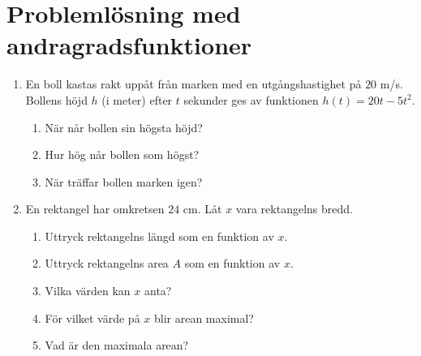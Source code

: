 \documentclass[a4paper,11pt]{article}
\begin{document}
\section{Problemlösning med andragradsfunktioner}

\begin{enumerate}[label=\textbf{\arabic*.}]
    \item En boll kastas rakt uppåt från marken med en utgångshastighet på $20$ m/s. Bollens höjd $h$ (i meter) efter $t$ sekunder ges av funktionen $h(t) = 20t - 5t^2$. 
    \begin{enumerate}[label=\alph*)]
        \item När når bollen sin högsta höjd?
        \item Hur hög når bollen som högst?
        \item När träffar bollen marken igen?
    \end{enumerate}
    
    \item En rektangel har omkretsen $24$ cm. Låt $x$ vara rektangelns bredd.
    \begin{enumerate}[label=\alph*)]
        \item Uttryck rektangelns längd som en funktion av $x$.
        \item Uttryck rektangelns area $A$ som en funktion av $x$.
        \item Vilka värden kan $x$ anta?
        \item För vilket värde på $x$ blir arean maximal?
        \item Vad är den maximala arean?
    \end{enumerate}
\end{enumerate}
\end{document}
